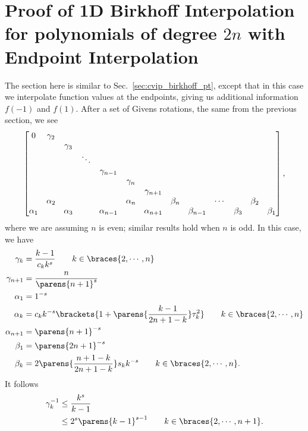 \section{Proof of 1D Birkhoff Interpolation for polynomials of degree $2n$
    with Endpoint Interpolation}
\label{sec:cvip_birkhoff_bdy}

The section here is similar to Sec.~\ref{sec:cvip_birkhoff_pt},
except that in this case we interpolate function values
at the endpoints, giving us additional information $f(-1)$ and $f(1)$.
After a set of Givens rotations, the same from the previous
section, we see
%
\begin{equation}
    \setcounter{MaxMatrixCols}{20}
    \begin{bmatrix}
        0 & \gamma_{2} & \\
        & & \gamma_{3} & \\
        & & & \ddots & \\
        & & & & \gamma_{n-1} \\
        & & & & & \gamma_{n} \\
        & & & & & & \gamma_{n+1} \\
        & \alpha_{2} & & & & \alpha_{n} & & \beta_{n} & &
            \cdots & & \beta_{2} & \\
        \alpha_{1} & & \alpha_{3} & & \alpha_{n-1} & & \alpha_{n+1} &
            & \beta_{n-1} & & \beta_{3} & & \beta_{1} \\
    \end{bmatrix},
\end{equation}
%
where we are assuming $n$ is even; similar results hold when $n$ is odd.
In this case, we have
%
\begin{align}
    \gamma_{k} &= \frac{k-1}{c_{k}k^{s}} \qquad k\in\braces{2,\cdots,n}
        \nonumber\\
    \gamma_{n+1} &= \frac{n}{\parens{n+1}^{s}} \nonumber\\
    \alpha_{1} &= 1^{-s} \nonumber\\
    \alpha_{k} &= c_{k}k^{-s}\brackets{1 +
        \parens{\frac{k-1}{2n+1-k}}\tau_{k}^{2}} \qquad k\in\braces{2,\cdots,n}
            \nonumber\\
    \alpha_{n+1} &= \parens{n+1}^{-s} \nonumber\\
    \beta_{1} &= \parens{2n+1}^{-s} \nonumber\\
    \beta_{k} &= 2\parens{\frac{n+1-k}{2n+1-k}}s_{k}k^{-s}
        \qquad k\in\braces{2,\cdots,n}.
\end{align}
%
It follows
%
\begin{align}
    \gamma_{k}^{-1} &\le \frac{k^{s}}{k-1} \nonumber\\
        &\le 2^{s}\parens{k-1}^{s-1} \qquad k\in\braces{2,\cdots,n+1}.
    \label{eq:birkhoff_bdy_gamma_bound}
\end{align}
